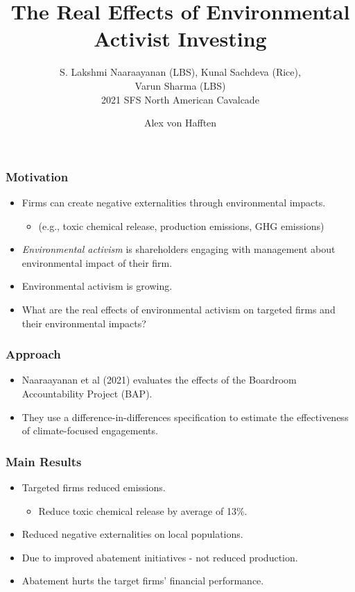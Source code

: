 \documentclass{beamer}
\title[Environmental Activist Investing]{The Real Effects of Environmental Activist Investing}
\subtitle{S. Lakshmi Naaraayanan (LBS), Kunal Sachdeva (Rice), \\Varun Sharma (LBS) \\ 2021 SFS North American Cavalcade}
\author{Alex von Hafften}
\institute{UW-Madison}
\begin{document}
\begin{frame}
\titlepage
\end{frame}


\begin{frame}
\frametitle{Motivation}

\begin{itemize}[<+->]
\item Firms can create negative externalities through environmental impacts.
\begin{itemize}
\item (e.g., toxic chemical release, production emissions, GHG emissions) 
\end{itemize}
\bigskip
\item \textit{Environmental activism} is shareholders engaging with management about environmental impact of their firm.
\bigskip
\item Environmental activism is growing.
\bigskip
\item What are the real effects of environmental activism on targeted firms and their environmental impacts?
\end{itemize}

\end{frame}


\begin{frame}
\frametitle{Approach}
\begin{itemize}[<+->]
\item Naaraayanan et al (2021) evaluates the effects of the Boardroom Accountability Project (BAP).
\bigskip
\item They use a difference-in-differences specification to estimate the effectiveness of climate-focused engagements.
\end{itemize}
\end{frame}


\begin{frame}
\frametitle{Main Results}
\begin{itemize}[<+->]
\item Targeted firms reduced emissions.
\begin{itemize}
\item Reduce toxic chemical release by average of 13\%.
\end{itemize}
\bigskip
\item Reduced negative externalities on local populations.
\bigskip
\item Due to improved abatement initiatives - not reduced production.
\bigskip
\item Abatement hurts the target firms' financial performance.
\end{itemize}
\end{frame}
\end{document}
